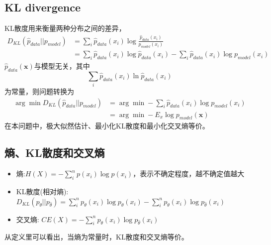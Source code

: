 \subsection{KL divergence}
KL散度用来衡量两种分布之间的差异，
\begin{equation}
    \begin{split}
        D_{KL}(\hat p_{data}|| p_{model}) &= \sum_i \hat p_{data}(x_i) \log{\frac{\hat p_{data}(x_i)}{p_{model}(x_i)}}\\
        &= \sum_i \hat p_{data}(x_i) \log\hat p_{data}(x_i) - \sum_i \hat p_{data}(x_i) \log p_{model}(x_i)
    \end{split}
\end{equation}
$\hat p_{data}(\boldsymbol{x})$与模型无关，其中
\begin{equation}
    \sum_i \hat p_{data}(x_i) \ln\hat p_{data}(x_i)
\end{equation}
为常量，则问题转换为
\begin{equation}
    \begin{split}
        \arg \min D_{KL}(\hat p_{data}|| p_{model}) &= \arg \min - \sum_i \hat p_{data}(x_i) \log p_{model}(x_i)\\
        &= \arg \min - E_x \log p_{model}(\mathbf{x})
    \end{split}
\end{equation}
在本问题中，极大似然估计、最小化KL散度和最小化交叉熵等价。

\subsection{熵、KL散度和交叉熵}
\begin{itemize}
    \item 熵:$H(X)=-\sum_i^n p(x_i)\log p(x_i)$，表示不确定程度，越不确定值越大
    \item KL散度(相对熵): $D_{KL}(p_{\theta}||p_{\hat\theta}) = \sum_i^n p_{\theta}(x_i) \log {p_{\theta}(x_i)} - \sum_i^np_{\theta}(x_i) \log {p_{\hat\theta}(x_i)}$
    \item 交叉熵: $CE(X) = - \sum_i^np_{\theta}(x_i) \log {p_{\hat\theta}(x_i)}$
\end{itemize}
从定义里可以看出，当熵为常量时，KL散度和交叉熵等价。

